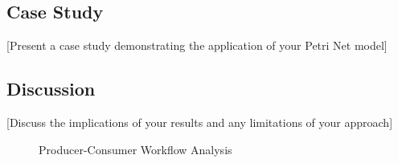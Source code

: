 \subsection{Case Study}

[Present a case study demonstrating the application of your Petri Net model]

\subsection{Discussion}

[Discuss the implications of your results and any limitations of your approach]

\begin{figure}[htbp]
\centering
\resizebox{0.9\columnwidth}{!}{}
\caption{Producer-Consumer Workflow Analysis}
\label{fig:producer_consumer}
\end{figure}